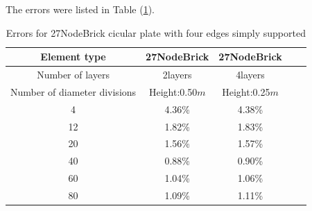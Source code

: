 \documentclass[fleqn,11pt,letter]{article}
\begin{document}
The errors were listed in Table (\ref{table Errors for 27NodeBrick cicular plate with four edges simply supported}).

\begin{table}[H]
  \centering
  \caption{Errors for 27NodeBrick cicular plate with four edges simply supported}
  \label{table Errors for 27NodeBrick cicular plate with four edges simply supported}
  \begin{tabular}{|c|c|c|c|c|}
  \hline
  Element type     & 27NodeBrick     & 27NodeBrick      \\ \hline
  Number of layers      & 2layers         & 4layers          \\ \hline
  Number of diameter divisions & Height:0.50$m$ & Height:0.25$m$  \\ \hline
  4            & 4.36\% & 4.38\%      \\ \hline
  12           & 1.82\% & 1.83\%      \\ \hline
  20           & 1.56\% & 1.57\%      \\ \hline
  40           & 0.88\% & 0.90\%      \\ \hline
  60           & 1.04\% & 1.06\%      \\ \hline
  80           & 1.09\% & 1.11\%      \\
  \hline
  \end{tabular}
\end{table}

\end{document}
